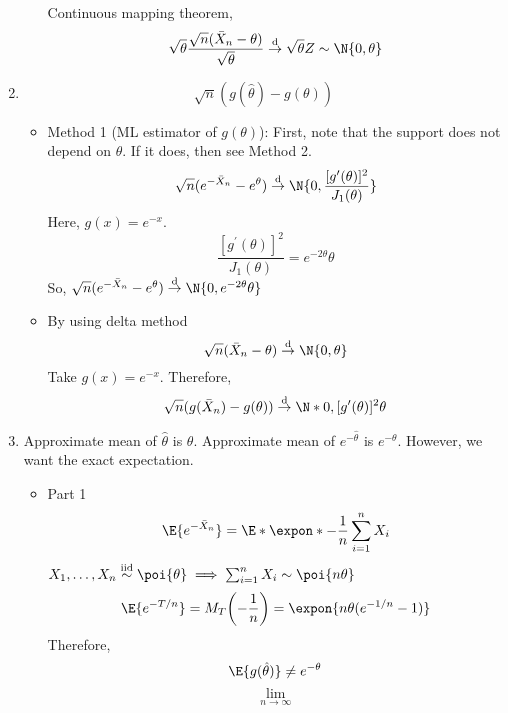 \begin{Example}{}{}
\begin{enumerate}[label=(\roman*)]
\begin{itemize}
                        Continuous mapping theorem,
                        \[ \sqrt{\theta}\frac{\sqrt{n}(\bar{X}_n-\theta)}{\sqrt{\theta}}
                            \stackrel{\text{d}}{\to}\sqrt{\theta}Z \sim \N{0,\theta} \]
              \end{itemize}
        \item \[ \sqrt{n}(g(\hat{\theta})-g(\theta)) \]
              \begin{itemize}
                  \item Method 1 (ML estimator of $ g(\theta) $):
                        First, note that
                        the support does not depend on $ \theta $. If it does,
                        then see Method 2.
                        \[ \sqrt{n}(e^{-\bar{X}_n}-e^\theta)
                            \stackrel{\text{d}}{\to}\N{0,\frac{[g^\prime(\theta)]^2}{J_1(\theta)} } \]
                        Here, $ g(x)=e^{-x} $.
                        \[ \frac{[g^\prime(\theta)]^2}{J_1(\theta)}=e^{-2\theta}\theta  \]
                        So, $ \sqrt{n}(e^{-\bar{X}_n}-e^\theta)
                            \stackrel{\text{d}}{\to}\N{0,e^{-2\theta}\theta} $
                  \item By using delta method
                        \[ \sqrt{n}(\bar{X}_n-\theta) \stackrel{\text{d}}{\to}\N{0,\theta} \]
                        Take $ g(x)=e^{-x} $. Therefore,
                        \[ \sqrt{n}(g(\bar{X}_n)-g(\theta)) \stackrel{\text{d}}{\to}
                            \N*{0,[g^\prime(\theta)]^2\theta} \]
              \end{itemize}
        \item Approximate mean of $ \hat{\theta} $ is $ \theta $.
              Approximate mean of $ e^{-\hat{\theta}} $ is $ e^{-\theta} $.
              However, we want the exact expectation.
              \begin{itemize}
                  \item Part 1
                        \[ \E{e^{-\bar{X}_n}}=\E*{
                                \expon*{-\frac{1}{n} \sum_{i=1}^{n} X_i}
                            } \]
                        $ X_1,\ldots,X_n \stackrel{\text{iid}}{\sim}\poi{\theta}
                            \implies \sum_{i=1}^{n} X_i \sim \poi{n\theta} $
                        \[ \E{e^{-T/n}}=
                            M_T\biggl(-\frac{1}{n} \biggr)=
                            \expon{n\theta(e^{-1/n}-1)} \]
                        Therefore,
                        \[ \E{g(\hat{\theta})}\neq e^{-\theta} \]
                        \[ \lim\limits_{{n} \to {\infty}}
\]
\end{itemize}
\end{enumerate}
\end{Example}
